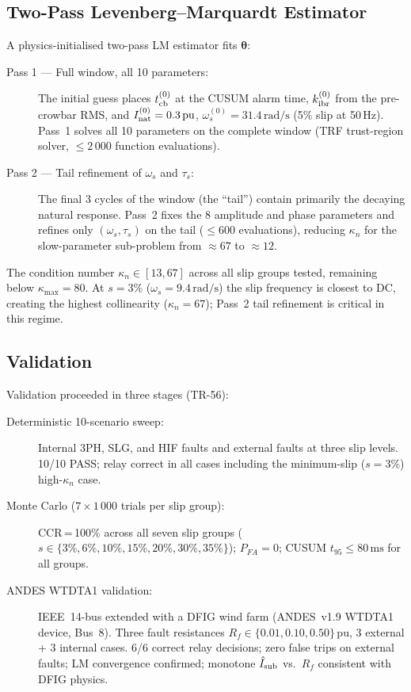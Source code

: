 \subsection{Two-Pass Levenberg--Marquardt Estimator}
\label{sec:ch6_dfig_lm}

A physics-initialised two-pass LM estimator fits $\boldsymbol{\theta}$:

\begin{description}
  \item[Pass 1 — Full window, all 10 parameters:]
    The initial guess places $t_{\rm cb}^{(0)}$ at the CUSUM alarm time,
    $k_{\rm ibr}^{(0)}$ from the pre-crowbar RMS, and
    $I_{\rm nat}^{(0)} = 0.3\,\text{pu}$, $\omega_s^{(0)} = 31.4\,\text{rad/s}$
    (5\% slip at 50\,Hz).
    Pass~1 solves all 10 parameters on the complete window
    (TRF trust-region solver, $\leq 2\,000$ function evaluations).

  \item[Pass 2 — Tail refinement of $\omega_s$ and $\tau_s$:]
    The final 3 cycles of the window (the ``tail'') contain primarily the
    decaying natural response.  Pass~2 fixes the 8 amplitude and phase
    parameters and refines only $(\omega_s, \tau_s)$ on the tail
    ($\leq 600$ evaluations), reducing $\kappa_n$ for the slow-parameter
    sub-problem from $\approx 67$ to $\approx 12$.
\end{description}

The condition number $\kappa_n \in [13, 67]$ across all slip groups tested,
remaining below $\kappa_{\max} = 80$.  At $s = 3\%$ ($\omega_s = 9.4\,\text{rad/s}$)
the slip frequency is closest to DC, creating the highest collinearity
($\kappa_n = 67$); Pass~2 tail refinement is critical in this regime.

\subsection{Validation}
\label{sec:ch6_87g_val}

Validation proceeded in three stages (TR-56):

\begin{description}
  \item[Deterministic 10-scenario sweep:]
    Internal 3PH, SLG, and HIF faults and external faults at three slip levels.
    10/10 PASS; relay correct in all cases including the minimum-slip ($s=3\%$)
    high-$\kappa_n$ case.

  \item[Monte Carlo ($7 \times 1\,000$ trials per slip group):]
    CCR\,=\,100\% across all seven slip groups
    ($s \in \{3\%,6\%,10\%,15\%,20\%,30\%,35\%\}$);
    $P_{FA} = 0$;
    CUSUM $t_{95} \leq 80\,\text{ms}$ for all groups.

  \item[ANDES WTDTA1 validation:]
    IEEE~14-bus extended with a DFIG wind farm (ANDES~v1.9 WTDTA1 device,
    Bus~8).  Three fault resistances $R_f \in \{0.01, 0.10, 0.50\}\,\text{pu}$,
    3 external + 3 internal cases.
    6/6 correct relay decisions; zero false trips on external faults;
    LM convergence confirmed; monotone $\hat{I}_{\rm sub}$ vs.\ $R_f$
    consistent with DFIG physics.
\end{description}

